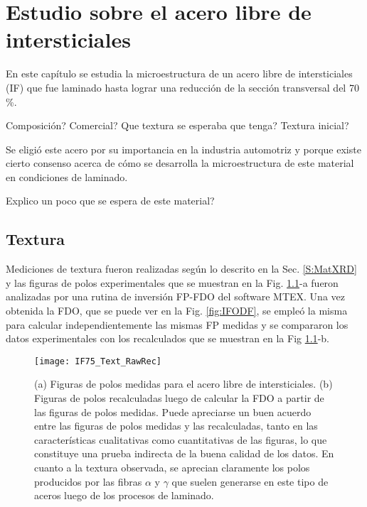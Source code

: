 \chapter{Estudio sobre el acero libre de intersticiales}\label{C:IF}
\graphicspath{{./figs/03_IF/}}

En este capítulo se estudia la microestructura de un acero libre de intersticiales (IF) que fue laminado hasta lograr una reducción de la sección transversal del 70\,\%.

Composición? Comercial? Que textura se esperaba que tenga? Textura inicial?

Se eligió este acero por su importancia en la industria automotriz y porque existe cierto consenso acerca de cómo se desarrolla la microestructura de este material en condiciones de laminado.

Explico un poco que se espera de este material?

\section{Textura}\label{S:IFText}
Mediciones de textura fueron realizadas según lo descrito en la Sec. \ref{S:MatXRD} y las figuras de polos experimentales que se muestran en la Fig. \ref{fig:IFTextRawRec}-a fueron analizadas por una rutina de inversión FP-FDO del software MTEX.
Una vez obtenida la FDO, que se puede ver en la Fig. \ref{fig:IFODF}, se empleó la misma para calcular independientemente las mismas FP medidas y se compararon los datos experimentales con los recalculados que se muestran en la Fig \ref{fig:IFTextRawRec}-b.

\begin{figure}[!htb]
  \centering
  \texttt{[image: IF75\_Text\_RawRec]}
  \caption{(a) Figuras de polos medidas para el acero libre de intersticiales. (b) Figuras de polos recalculadas luego de calcular la FDO a partir de las figuras de polos medidas. Puede apreciarse un buen acuerdo entre las figuras de polos medidas y las recalculadas, tanto en las características cualitativas como cuantitativas de las figuras, lo que constituye una prueba indirecta de la buena calidad de los datos. En cuanto a la textura observada, se aprecian claramente los polos producidos  por las fibras $\alpha$ y $\gamma$ que suelen generarse en este tipo de aceros luego de los procesos de laminado.}
  \label{fig:IFTextRawRec}
\end{figure}

